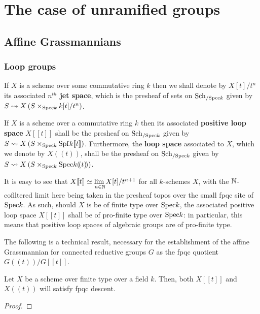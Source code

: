 \section{The case of unramified groups}
    \subsection{Affine Grassmannians}
        \subsubsection{Loop groups}
            \begin{definition} \label{def: jet_spaces}
                If $X$ is a scheme over some commutative ring $k$ then we shall denote by $X[t]/t^n$ its associated \textbf{$n^{th}$ jet space}, which is the presheaf of sets on $\mathrm{Sch}_{/\mathrm{Spec} k}$ given by $S \mapsto X\left(S \x_{\Spec k} k[t]/t^n\right)$.
            \end{definition}
            \begin{definition} \label{def: loop_spaces}
                If $X$ is a scheme over a commutative ring $k$ then its associated \textbf{positive loop space} $X[\![t]\!]$ shall be the presheaf on $\mathrm{Sch}_{/\mathrm{Spec} k}$ given by $S \mapsto X\left(S \x_{\Spec k} \Spf k[\![t]\!]\right)$. Furthermore, the \textbf{loop space} associated to $X$, which we denote by $X(\!(t)\!)$, shall be the presheaf on $\mathrm{Sch}_{/\mathrm{Spec} k}$ given by $S \mapsto X\left(S \x_{\Spec k} \Spec k(\!(t)\!)\right)$.
            \end{definition}
            \begin{remark}
                It is easy to see that $X[\![t]\!] \simeq \underset{n \in \mathbb{N}}{\operatorname{lim} \:} X[t]/t^{n + 1}$ for all $k$-schemes $X$, with the $\mathbb{N}$-cofiltered limit here being taken in the presheaf topos over the small fpqc site of $\mathrm{Spec} k$. As such, should $X$ is be of finite type over $\mathrm{Spec} k$, the associated positive loop space $X[\![t]\!]$ shall be of pro-finite type over $\mathrm{Spec} k$: in particular, this means that positive loop spaces of algebraic groups are of pro-finite type.
            \end{remark}
            The following is a technical result, necessary for the establishment of the affine Grassmannian for connected reductive groups $G$ as the fpqc quotient $G(\!(t)\!)/G[\![t]\!]$.
            \begin{proposition} \label{prop: loop_spaces_are_fpqc_sheaves}
                Let $X$ be a scheme over finite type over a field $k$. Then, both $X[\![t]\!]$ and $X(\!(t)\!)$ will satisfy fpqc descent. 
            \end{proposition}
                \begin{proof}
                        
                \end{proof}
            
